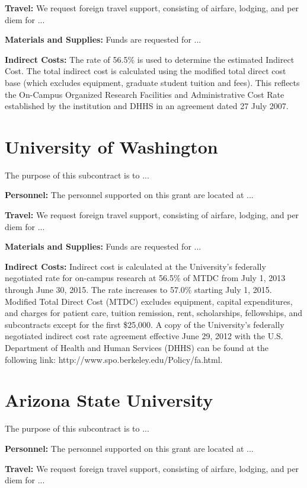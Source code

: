 \documentclass[onecolumn,11pt]{aastex}
\begin{document}
{\bf Travel:} We request foreign travel support, consisting of airfare, lodging, and per diem for ...

{\bf Materials and Supplies:}  Funds are requested for ... 

{\bf Indirect Costs:}
The rate of 56.5\% is used to determine the estimated Indirect Cost. The total indirect cost is calculated using the modified total direct cost base (which excludes equipment, graduate student tuition and fees). This reflects the On-Campus Organized Research Facilities and Administrative Cost Rate established by the institution and DHHS in an agreement dated 27 July 2007.



\section{University of Washington}
The purpose of this subcontract is to ...

{\bf Personnel:} 
The personnel supported on this grant are located at ...

{\bf Travel:} We request foreign travel support, consisting of airfare, lodging,
and per diem for ...

{\bf Materials and Supplies:}  Funds are requested for ... 

{\bf Indirect Costs:}
Indirect cost is calculated at the University's federally negotiated rate for on-campus research at 56.5\% of MTDC from July 1, 2013 through June 30, 2015.  The rate increases to 57.0\% starting July 1, 2015.  Modified Total Direct Cost (MTDC) excludes equipment, capital expenditures, and charges for patient care, tuition remission, rent, scholarships, fellowships, and subcontracts except for the first \$25,000.  A copy of the University's federally negotiated indirect cost rate agreement effective June 29, 2012 with the U.S. Department of Health and Human Services (DHHS) can be found at the following link: http://www.spo.berkeley.edu/Policy/fa.html.



\section{Arizona State University}
The purpose of this subcontract is to ...

{\bf Personnel:} 
The personnel supported on this grant are located at ...

{\bf Travel:} We request foreign travel support, consisting of airfare, lodging,
and per diem for ...
\end{document}
